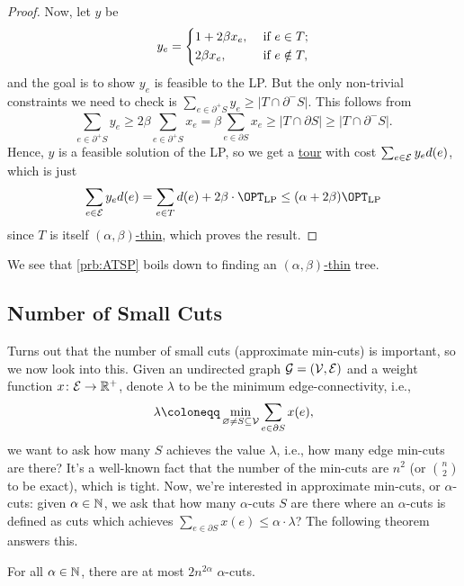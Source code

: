 \begin{proof}
	Now, let \(y\) be
	\[
		y_e = \begin{dcases}
			1 + 2\beta x_e, & \text{ if } e\in T ;    \\
			2\beta x_e,     & \text{ if } e \notin T,
		\end{dcases}
	\]
	and the goal is to show \(y_e\) is feasible to the LP. But the only non-trivial constraints we need to check is \(\sum_{e\in \partial ^+ S}y_e \geq \left\vert T \cap \partial ^- S \right\vert \). This follows from
	\[
		\sum_{e\in \partial ^+ S} y_e \geq 2\beta \sum_{e\in \partial ^+ S}x_e = \beta \sum_{e\in \partial S} x_e \geq \left\vert T \cap \partial S \right\vert \geq \left\vert T \cap \partial ^- S \right\vert.
	\]
	Hence, \(y\) is a feasible solution of the LP, so we get a \hyperref[def:tour]{tour} with cost \(\sum_{e\in \mathcal{\MakeUppercase{e}} }y_e d(e) \), which is just
	\[
		\sum_{e\in \mathcal{\MakeUppercase{e}} } y_e d(e) = \sum_{e\in T} d(e) + 2\beta \cdot \OPT_{\mathrm{LP} } \leq (\alpha + 2\beta )\OPT_{\mathrm{LP} }
	\]
	since \(T\) is itself \hyperref[def:thin]{\((\alpha , \beta )\)-thin}, which proves the result.
\end{proof}

We see that \autoref{prb:ATSP} boils down to finding an \hyperref[def:thin]{\((\alpha , \beta )\)-thin} tree.

\subsection{Number of Small Cuts}
Turns out that the number of small cuts (approximate min-cuts) is important, so we now look into this. Given an undirected graph \(\mathcal{\MakeUppercase{g}} =(\mathcal{\MakeUppercase{v}} , \mathcal{\MakeUppercase{e}} )\) and a weight function \(x\colon \mathcal{\MakeUppercase{e}} \to \mathbb{\MakeUppercase{r}} ^+\), denote \(\lambda \) to be the minimum edge-connectivity, i.e.,
\[
	\lambda \coloneqq \min _{\varnothing \neq S \subseteq \mathcal{\MakeUppercase{v}} } \sum_{e\in \partial S} x(e),
\]
we want to ask how many \(S\) achieves the value \(\lambda \), i.e., how many edge min-cuts are there? It's a well-known fact that the number of the min-cuts are \(n^2\) (or \(\binom{n}{2}\) to be exact), which is tight. Now, we're interested in approximate min-cuts, or \(\alpha\)-cuts: given \(\alpha \in \mathbb{\MakeUppercase{n}} \), we ask that how many \(\alpha \)-cuts \(S\) are there where an \(\alpha \)-cuts is defined as cuts which achieves \(\sum_{e\in \partial S} x(e) \leq \alpha \cdot \lambda \)? The following theorem answers this.

\begin{theorem}
	For all \(\alpha \in \mathbb{\MakeUppercase{n}} \), there are at most \(2n^{2\alpha }\) \(\alpha\)-cuts.
\end{theorem}